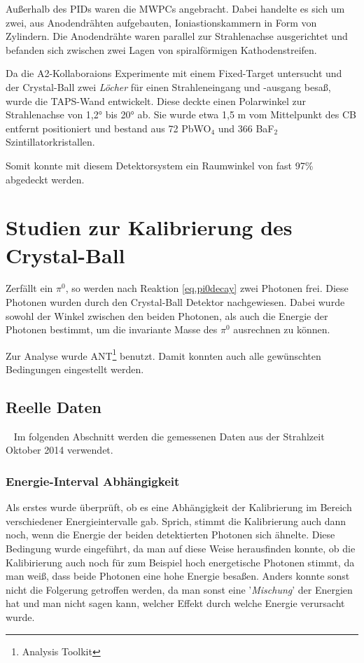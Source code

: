 \documentclass[a4paper,11pt,oneside,final,german,openbib,pdftex]{scrbook}
\begin{document}
{Au{\ss}erhalb des PIDs waren die MWPCs angebracht. Dabei handelte es sich um zwei, aus Anodendr\"ahten aufgebauten, Ioniastionskammern in Form von Zylindern. Die Anodendr\"ahte waren parallel zur Strahlenachse ausgerichtet und befanden sich zwischen zwei Lagen von spiralf\"ormigen Kathodenstreifen. 

Da die A2-Kollaboraions Experimente mit einem Fixed-Target untersucht und der Crystal-Ball zwei \textit{L\"ocher} f\"ur einen Strahleneingang und -ausgang besa{\ss}, wurde die TAPS-Wand entwickelt. Diese deckte einen Polarwinkel zur Strahlenachse von 1,2° bis 20° ab. Sie wurde etwa 1,5 m vom Mittelpunkt des CB entfernt positioniert und bestand aus 72 PbWO$_4$ und 366 BaF$_2$ Szintillatorkristallen. 

Somit konnte mit diesem Detektorsystem ein Raumwinkel von fast 97\% abgedeckt werden.


\chapter{Studien zur Kalibrierung des Crystal-Ball}

Zerf\"allt ein $\pi^0$, so werden nach Reaktion \ref{eq.pi0decay} zwei Photonen frei. Diese Photonen wurden durch den Crystal-Ball Detektor nachgewiesen. Dabei wurde sowohl der Winkel zwischen den beiden Photonen, als auch die Energie der Photonen bestimmt, um die invariante Masse des $\pi^0$ ausrechnen zu k\"onnen.

Zur Analyse wurde ANT\footnote{Analysis Toolkit} benutzt. Damit konnten auch alle gew\"unschten Bedingungen eingestellt werden. 

\section{Reelle Daten}\
\label{sec:Reelle-Daten}
Im folgenden Abschnitt werden die gemessenen Daten aus der Strahlzeit Oktober 2014 verwendet.

\subsection{Energie-Interval Abhängigkeit}
\label{sec:Energie-Interval-Abhaengigkeit}

Als erstes wurde überprüft, ob es eine Abhängigkeit der Kalibrierung im Bereich verschiedener Energieintervalle gab. Sprich, stimmt die Kalibrierung auch dann noch, wenn die Energie der beiden detektierten Photonen sich ähnelte. Diese Bedingung wurde eingef\"uhrt, da man auf diese Weise herausfinden konnte, ob die Kalibirierung auch noch f\"ur zum Beispiel hoch energetische Photonen stimmt, da man wei{\ss}, dass beide Photonen eine hohe Energie besa{\ss}en. Anders konnte sonst nicht die Folgerung getroffen werden, da man sonst eine '\textit{Mischung}' der Energien hat und man nicht sagen kann, welcher Effekt durch welche Energie verursacht wurde.

}
\end{document}
